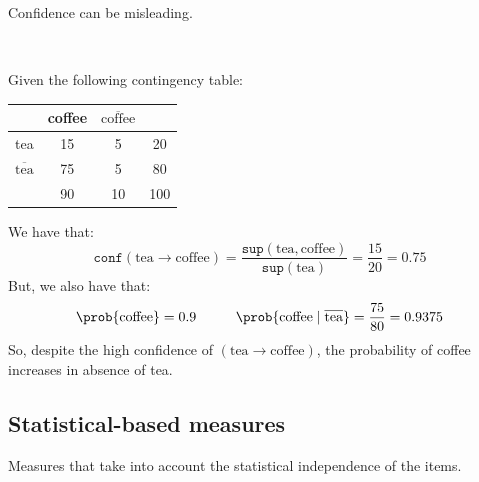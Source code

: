 \begin{remark}
    Confidence can be misleading.
    \begin{example} \phantom{}\\
        \begin{minipage}[t]{0.36\textwidth}
            Given the following contingency table:
            \begin{center}
                \begin{tabular}{c|c|c|c}
                                                & coffee    & $\overline{\text{coffee}}$ & \\
                    \hline
                    tea                         & 15        & 5                     & 20 \\
                    \hline
                    $\overline{\text{tea}}$     & 75        & 5                     & 80 \\
                    \hline
                                                & 90        & 10                    & 100 \\
                \end{tabular}
            \end{center}
        \end{minipage}
        \hspace{0.5cm}
        \begin{minipage}[t]{0.6\textwidth}
            We have that:
            \[ \texttt{conf}(\text{tea} \rightarrow \text{coffee}) = \frac{\texttt{sup}(\text{tea}, \text{coffee})}{\texttt{sup}(\text{tea})} = \frac{15}{20} = 0.75 \]
            But, we also have that:
            \[ \prob{\text{coffee}} = 0.9 \hspace*{1cm} \prob{\text{coffee} \mid \overline{\text{tea}}} = \frac{75}{80} = 0.9375 \]
            So, despite the high confidence of $(\text{tea} \rightarrow \text{coffee})$,
            the probability of coffee increases in absence of tea.
        \end{minipage}
    \end{example}
\end{remark}


\subsection{Statistical-based measures}

Measures that take into account the statistical independence of the items.

